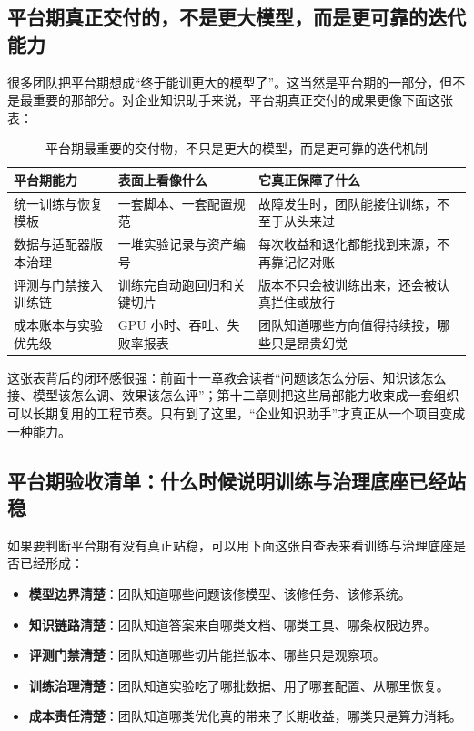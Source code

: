 \subsection{平台期真正交付的，不是更大模型，而是更可靠的迭代能力}
很多团队把平台期想成“终于能训更大的模型了”。这当然是平台期的一部分，但不是最重要的那部分。对企业知识助手来说，平台期真正交付的成果更像下面这张表：

\begin{table}[H]
\centering
\small
\begin{tabularx}{\textwidth}{>{\raggedright\arraybackslash}p{2.8cm}>{\raggedright\arraybackslash}p{3cm}>{\raggedright\arraybackslash}X}
\toprule
\textbf{平台期能力} & \textbf{表面上看像什么} & \textbf{它真正保障了什么} \\
\midrule
统一训练与恢复模板 & 一套脚本、一套配置规范 & 故障发生时，团队能接住训练，不至于从头来过 \\
数据与适配器版本治理 & 一堆实验记录与资产编号 & 每次收益和退化都能找到来源，不再靠记忆对账 \\
评测与门禁接入训练链 & 训练完自动跑回归和关键切片 & 版本不只会被训练出来，还会被认真拦住或放行 \\
成本账本与实验优先级 & GPU 小时、吞吐、失败率报表 & 团队知道哪些方向值得持续投，哪些只是昂贵幻觉 \\
\bottomrule
\end{tabularx}
\caption{平台期最重要的交付物，不只是更大的模型，而是更可靠的迭代机制}
\label{tab:platform-delivery}
\end{table}

这张表背后的闭环感很强：前面十一章教会读者“问题该怎么分层、知识该怎么接、模型该怎么调、效果该怎么评”；第十二章则把这些局部能力收束成一套组织可以长期复用的工程节奏。只有到了这里，“企业知识助手”才真正从一个项目变成一种能力。

\subsection{平台期验收清单：什么时候说明训练与治理底座已经站稳}
如果要判断平台期有没有真正站稳，可以用下面这张自查表来看训练与治理底座是否已经形成：
\begin{itemize}
  \item \textbf{模型边界清楚}：团队知道哪些问题该修模型、该修任务、该修系统。
  \item \textbf{知识链路清楚}：团队知道答案来自哪类文档、哪类工具、哪条权限边界。
  \item \textbf{评测门禁清楚}：团队知道哪些切片能拦版本、哪些只是观察项。
  \item \textbf{训练治理清楚}：团队知道实验吃了哪批数据、用了哪套配置、从哪里恢复。
  \item \textbf{成本责任清楚}：团队知道哪类优化真的带来了长期收益，哪类只是算力消耗。
\end{itemize}

